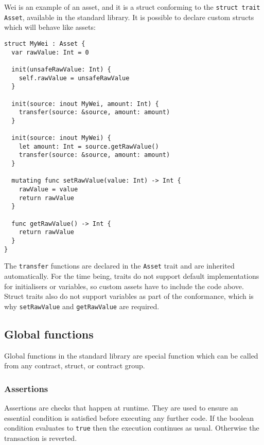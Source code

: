 Wei is an example of an asset, and it is a struct conforming to the \texttt{struct trait Asset}, available in the standard library. It is possible to declare custom structs which will behave like assets:

\begin{verbatim}
struct MyWei : Asset {
  var rawValue: Int = 0

  init(unsafeRawValue: Int) {
    self.rawValue = unsafeRawValue
  }

  init(source: inout MyWei, amount: Int) {
    transfer(source: &source, amount: amount)
  }

  init(source: inout MyWei) {
    let amount: Int = source.getRawValue()
    transfer(source: &source, amount: amount)
  }

  mutating func setRawValue(value: Int) -> Int {
    rawValue = value
    return rawValue
  }

  func getRawValue() -> Int {
    return rawValue
  }
}
\end{verbatim}

The \texttt{transfer} functions are declared in the \texttt{Asset} trait and are inherited automatically. For the time being, traits do not support default implementations for initialisers or variables, so custom assets have to include the code above. Struct traits also do not support variables as part of the conformance, which is why \texttt{setRawValue} and \texttt{getRawValue} are required.

\subsection{Global functions}
\label{sec:appendix-b-global-functions}

Global functions in the standard library are special function which can be called from any contract, struct, or contract group.

\subsubsection{Assertions}
\label{sec:appendix-b-assertions}

Assertions are checks that happen at runtime. They are used to ensure an essential condition is satisfied before executing any further code. If the boolean condition evaluates to \texttt{true} then the execution continues as usual. Otherwise the transaction is reverted.


